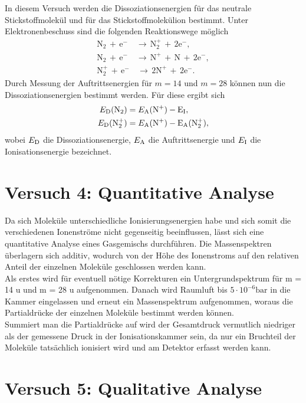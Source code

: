 In diesem Versuch werden die Dissoziationsenergien für das neutrale Stickstoffmolekül und für das Stickstoffmolekülion bestimmt. Unter Elektronenbeschuss sind die folgenden Reaktionswege möglich
\begin{align}
 \textrm{N}_{2} \, + \, \textrm{e}^{-} \, &\to \, \textrm{N}_{2}^{+} \, + \, 2\textrm{e}^{-}, \\
 \textrm{N}_{2} \, + \, \textrm{e}^{-} \, &\to \, \textrm{N}^{+} \, + \, \textrm{N} \, + \, 2\textrm{e}^{-}, \\
 \textrm{N}_{2}^{+} \, + \, \textrm{e}^{-} &\, \to \, 2\textrm{N}^{+} \, + \, 2\textrm{e}^{-}.
\end{align}
Durch Messung der Auftrittsenergien für $m=14$ und $m=28$ können nun die Dissoziationsenergien bestimmt werden. Für diese ergibt sich
\begin{align*}
 E_{\rm{D}}(\rm{N}_{2}) &= E_{\rm{A}}(\rm{N}^{+}) - E_{\rm{I}}, \\
 E_{\rm{D}}(\rm{N}_{2}^{+}) &= E_{\rm{A}}(\rm{N}^{+}) - E_{\rm{A}}(\rm{N}_{2}^{+}),
\end{align*}
wobei $E_{\rm{D}}$ die Dissoziationsenergie, $E_{\rm{A}}$ die Auftrittsenergie und $E_{\rm{I}}$ die Ionisationsenergie bezeichnet.




\section{Versuch 4: Quantitative Analyse}

Da sich Moleküle unterschiedliche Ionisierungsenergien habe und sich somit die verschiedenen Ionenströme nicht gegenseitig beeinflussen, lässt sich eine 
quantitative Analyse eines Gasgemischs durchführen. Die Massenspektren überlagern
sich additiv, wodurch von der Höhe des Ionenstroms auf den relativen Anteil der einzelnen Moleküle geschlossen werden kann.\\
Als erstes wird für eventuell nötige Korrekturen ein Untergrundspektrum für m = 14 u und m = 28 u aufgenommen.
Danach wird Raumluft bis $5\cdot10^{-6} \si{\bar}$ in die Kammer eingelassen und erneut ein Massenspektrum aufgenommen, woraus die Partialdrücke der einzelnen Moleküle bestimmt werden können.\\
Summiert man die Partialdrücke auf wird der Gesamtdruck vermutlich niedriger als der gemessene Druck in der Ionisationskammer sein, da nur ein Bruchteil der Moleküle tatsächlich ionisiert wird und am Detektor erfasst werden kann.

\section{Versuch 5: Qualitative Analyse}

